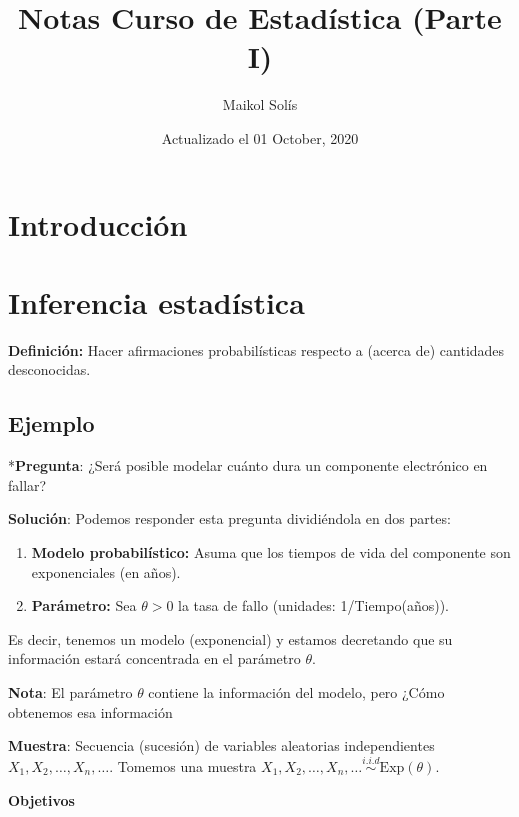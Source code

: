 \documentclass[
  12pt,
]{book}
\title{Notas Curso de Estadística (Parte I)}
\author{Maikol Solís}
\date{Actualizado el 01 October, 2020}
\providecommand{\tightlist}{%
  \setlength{\itemsep}{0pt}\setlength{\parskip}{0pt}}
\begin{document}
\maketitle

{
\hypersetup{linkcolor=}
\setcounter{tocdepth}{4}
\tableofcontents
}
\hypertarget{introducciuxf3n}{%
\chapter{Introducción}\label{introducciuxf3n}}

\hypertarget{inferencia-estaduxedstica}{%
\chapter{Inferencia estadística}\label{inferencia-estaduxedstica}}

\textbf{Definición:} Hacer afirmaciones probabilísticas respecto a (acerca de)
cantidades desconocidas.

\hypertarget{ejemplo}{%
\section{Ejemplo}\label{ejemplo}}

*\textbf{Pregunta}: ¿Será posible modelar cuánto dura un componente electrónico en
fallar?

\textbf{Solución}: Podemos responder esta pregunta dividiéndola en dos partes:

\begin{enumerate}
\def\labelenumi{\arabic{enumi}.}
\tightlist
\item
  \textbf{Modelo probabilístico:} Asuma que los tiempos de vida del componente son
  exponenciales (en años).
\item
  \textbf{Parámetro:} Sea \(\theta > 0\) la tasa de fallo (unidades: 1/Tiempo(años)).
\end{enumerate}

Es decir, tenemos un modelo (exponencial) y estamos decretando que su información estará concentrada en el parámetro \(\theta\).

\textbf{Nota}: El parámetro \(\theta\) contiene la información del modelo,
pero ¿Cómo obtenemos esa información

\textbf{Muestra}: Secuencia (sucesión) de variables aleatorias independientes \(X_1,X_2,\dots, X_n,\dots\). Tomemos una muestra \(X_1,X_2,\dots, X_n,\dots \stackrel{i.i.d}{\sim} \text{Exp}(\theta)\).

\textbf{Objetivos}
\end{document}
